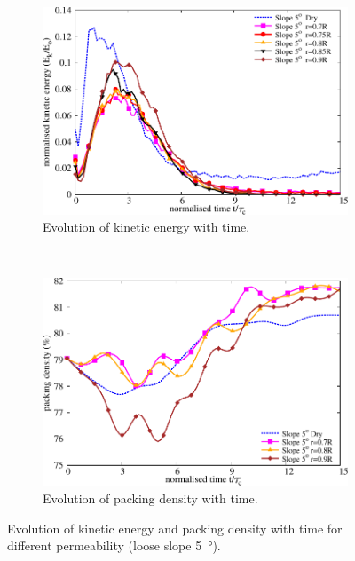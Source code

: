 \documentclass[12pt,twoside]{tuhhproc-en}
\begin{document}
\begin{figure}
\centering
\begin{subfigure}[b]{0.95\textwidth}
\includegraphics[width=0.95\columnwidth]{figs/KE_loose_5_slope}
\caption{Evolution of kinetic energy with time.}
\label{fig:KE5}
\end{subfigure} \\
\begin{subfigure}[b]{0.95\textwidth}
\centering
\includegraphics[width=0.95\columnwidth]{figs/Voronoi_5}
\caption{Evolution of packing density with time.}
\label{fig:voro5}
\end{subfigure}
\caption{Evolution of kinetic energy and packing density with time for 
different permeability (loose slope \SI{5}{\degree}).}
\label{fig:voro_ke_5}
\end{figure}
\end{document}
